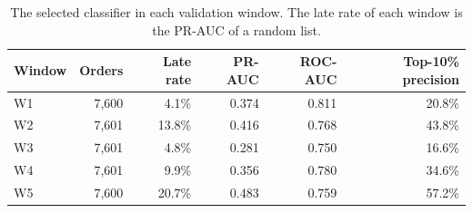 \begin{table}[H]
\centering\small
\caption{The selected classifier in each validation window. The late rate of each window is the PR-AUC of a random list.}
\label{tab:classifier-windows}
\begin{tabular}{@{}lrrrrr@{}}
\toprule
Window & Orders & Late rate & PR-AUC & ROC-AUC & Top-10\% precision \\
\midrule
W1 & 7,600 & 4.1\% & 0.374 & 0.811 & 20.8\% \\
W2 & 7,601 & 13.8\% & 0.416 & 0.768 & 43.8\% \\
W3 & 7,601 & 4.8\% & 0.281 & 0.750 & 16.6\% \\
W4 & 7,601 & 9.9\% & 0.356 & 0.780 & 34.6\% \\
W5 & 7,600 & 20.7\% & 0.483 & 0.759 & 57.2\% \\
\bottomrule
\end{tabular}
\end{table}
